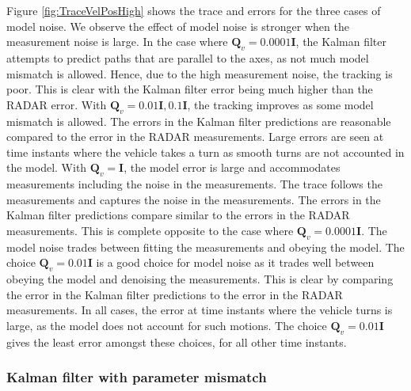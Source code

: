 \documentclass[11pt]{article}
\newcommand{\bI}{\mathbf{I}}
\newcommand{\bQ}{\mathbf{Q}}
\begin{document}
Figure \ref{fig:TraceVelPosHigh} shows the trace and errors for the three cases of model noise. We observe the effect of model noise is stronger when the measurement noise is large. In the case where $\bQ_{v}=0.0001\bI$, the Kalman filter attempts to predict paths that are parallel to the axes, as not much model mismatch is allowed. Hence, due to the high measurement noise, the tracking is poor. This is clear with the Kalman filter error being much higher than the RADAR error. With $\bQ_{v}=0.01\bI, 0.1\bI$, the tracking improves as some model mismatch is allowed. The errors in the Kalman filter predictions are reasonable compared to the error in the RADAR measurements. Large errors are seen at time instants where the vehicle takes a turn as smooth turns are not accounted in the model. With $\bQ_{v} = \bI$, the model error is large and accommodates measurements including the noise in the measurements. The trace follows the measurements and captures the noise in the measurements. The errors in the Kalman filter predictions compare similar to the errors in the RADAR measurements. This is complete opposite to the case where $\bQ_{v}=0.0001\bI$. The model noise trades between fitting the measurements and obeying the model. The choice $\bQ_{v}=0.01\bI$ is a good choice for model noise as it trades well between obeying the model and denoising the measurements. This is clear by comparing the error in the Kalman filter predictions to the error in the RADAR measurements. In all cases, the error at time instants where the vehicle turns is large, as the model does not account for such motions. The choice $\bQ_{v}=0.01\bI$ gives the least error amongst these choices, for all other time instants.


\subsubsection{Kalman filter with parameter mismatch}
\label{subsubsec:kalmanMismatch}
\end{document}
